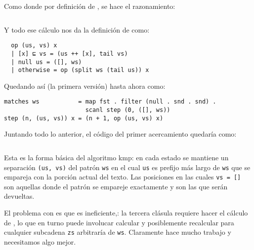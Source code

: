 Como  donde por definición de ,
se hace el razonamiento:

\inputminted{haskell}{definiciones/kmp/1-op-raz-eq.hs}

Y todo ese cálculo nos da la definición de  como:

\begin{verbatim}
  op (us, vs) x
  | [x] ⊑ vs = (us ++ [x], tail vs)
  | null us = ([], ws)
  | otherwise = op (split ws (tail us)) x
\end{verbatim}

Quedando así (la primera versión) hasta ahora como:

\begin{verbatim}
matches ws           = map fst . filter (null . snd . snd) .
                       scanl step (0, ([], ws))
step (n, (us, vs)) x = (n + 1, op (us, vs) x)
\end{verbatim}



Juntando todo lo anterior, el código del primer acercamiento quedaría como:

\inputminted{haskell}{codigo/haskell/NaiveMatching.hs}


Esta es la forma básica del algoritmo kmp: en cada estado se mantiene un separación \texttt{(us, vs)}
del patrón \texttt{ws} en el cual \texttt{us} es prefijo más largo de \texttt{ws} que se empareja
con la porción actual del texto. Las posiciones en las cuales \texttt{vs = []} son aquellas donde el patrón
se empareje exactamente y son las que serán devueltas.

El problema con  es que es ineficiente,: la tercera clásula requiere hacer el cálculo de
, lo que en turno puede involucar calcular y posiblemente recalcular
 para cualquier subcadena \texttt{zs} arbitraría de \texttt{ws}. Claramente
 hace mucho trabajo y necesitamos algo mejor. 

